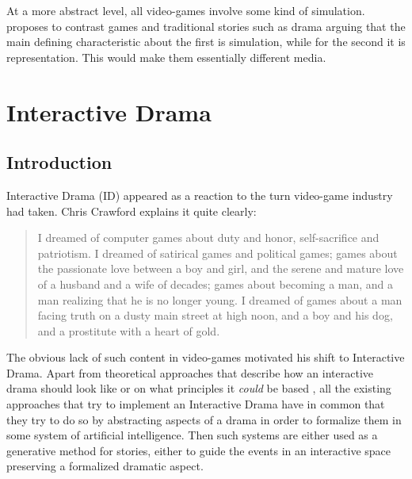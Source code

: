 \documentclass[
		twoside,openright,titlepage,numbers=noenddot,manychapters,
		headinclude,%
                footinclude=false,cleardoublepage=empty,
                BCOR=5mm,
		fontsize=11pt, %
                 enabledeprecatedfontcommands]{scrreprt}
\begin{document}
At a more abstract level, all video-games involve some kind of simulation. \cite{frasca2003simulation} proposes to contrast games and traditional stories such as drama arguing that the main defining characteristic about the first is simulation, while for the second it is representation. This would make them essentially different media. 





\section{Interactive Drama}
\label{sec_id}
\subsection{Introduction}

Interactive Drama (ID) appeared as a reaction to the turn video-game industry had taken. Chris Crawford explains it quite clearly\cite[page 349]{crawford2004cci}:

\begin{quote}

I dreamed of computer games about duty and honor, self-sacrifice and patriotism. I dreamed of satirical games and political games; games about the passionate love between a boy and girl, and the serene and mature love of a husband and a wife of decades; games about becoming a man, and a man realizing that he is no longer young. I dreamed of games about a man facing truth on a dusty main street at high noon, and a boy and his dog, and a prostitute with a heart of gold.

 \end{quote}

The obvious lack of such content in video-games motivated his shift to Interactive Drama. Apart from theoretical approaches that describe how an interactive drama should look like \cite[]{Murray1997} or on what principles it \emph{could} be based \cite[]{Glassner2004}, all the existing approaches that try to implement an Interactive Drama have in common that they try to do so by abstracting aspects of  a drama in order to formalize them in some system of artificial intelligence. Then such systems are either used as a generative method for stories, either to guide the events in an interactive space preserving a formalized dramatic aspect. 
\end{document}
